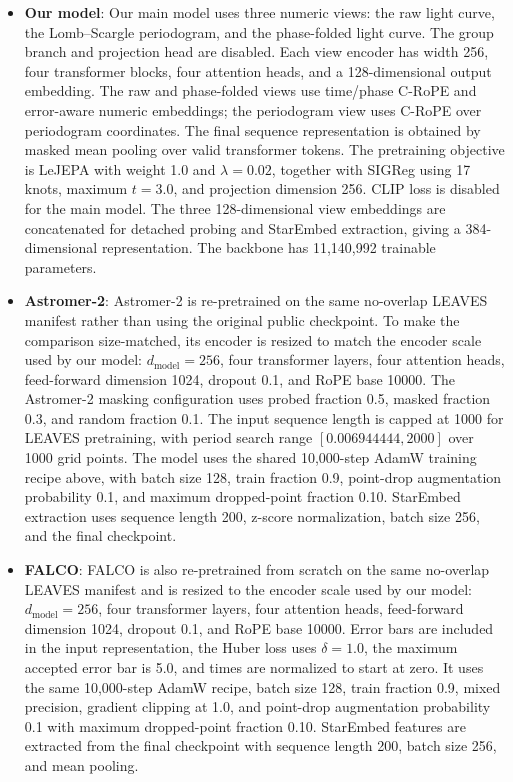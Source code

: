 \begin{itemize}
    \item \textbf{Our model}: Our main model uses three numeric views: the raw
    light curve, the Lomb--Scargle periodogram, and the phase-folded light
    curve.  The group branch and projection head are disabled.  Each view
    encoder has width 256, four transformer blocks, four attention heads, and a
    128-dimensional output embedding.  The raw and phase-folded views use
    time/phase C-RoPE and error-aware numeric embeddings; the periodogram view
    uses C-RoPE over periodogram coordinates.  The final sequence
    representation is obtained by masked mean pooling over valid transformer
    tokens.  The pretraining objective is LeJEPA with weight 1.0 and
    $\lambda=0.02$, together with SIGReg using 17 knots, maximum $t=3.0$, and
    projection dimension 256.  CLIP loss is disabled for the main model.  The
    three 128-dimensional view embeddings are concatenated for detached
    probing and StarEmbed extraction, giving a 384-dimensional representation.
    The backbone has 11,140,992 trainable parameters.

    \item \textbf{Astromer-2}: Astromer-2 is re-pretrained on the same
    no-overlap LEAVES manifest rather than using the original public checkpoint.
    To make the comparison size-matched, its encoder is resized to match the
    encoder scale used by our model: $d_{\mathrm{model}}=256$, four
    transformer layers, four attention heads, feed-forward dimension 1024,
    dropout 0.1, and RoPE base 10000.  The Astromer-2 masking configuration
    uses probed fraction 0.5, masked fraction 0.3, and random fraction 0.1.
    The input sequence length is capped at 1000 for LEAVES pretraining, with
    period search range $[0.006944444,2000]$ over 1000 grid points.  The model
    uses the shared 10,000-step AdamW training recipe above, with batch size
    128, train fraction 0.9, point-drop augmentation probability 0.1, and
    maximum dropped-point fraction 0.10.  StarEmbed extraction uses sequence
    length 200, z-score normalization, batch size 256, and the final
    checkpoint.

    \item \textbf{FALCO}: FALCO is also re-pretrained from scratch on the same
    no-overlap LEAVES manifest and is resized to the encoder scale used by our
    model:
    $d_{\mathrm{model}}=256$, four transformer layers, four attention heads,
    feed-forward dimension 1024, dropout 0.1, and RoPE base 10000.  Error bars
    are included in the input representation, the Huber loss uses
    $\delta=1.0$, the maximum accepted error bar is 5.0, and times are
    normalized to start at zero.  It uses the same 10,000-step AdamW recipe,
    batch size 128, train fraction 0.9, mixed precision, gradient clipping at
    1.0, and point-drop augmentation probability 0.1 with maximum dropped-point
    fraction 0.10.  StarEmbed features are extracted from the final
    checkpoint with sequence length 200, batch size 256, and mean pooling.


\end{itemize}
